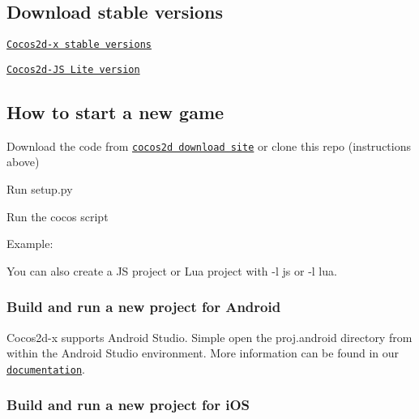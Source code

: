 \subsection*{Download stable versions }


\begin{DoxyItemize}
\item \href{http://www.cocos2d-x.org/download}{\tt Cocos2d-\/x stable versions}
\item \href{http://www.cocos2d-x.org/filecenter/jsbuilder}{\tt Cocos2d-\/\+JS Lite version}
\end{DoxyItemize}

\subsection*{How to start a new game }


\begin{DoxyEnumerate}
\item Download the code from \href{http://www.cocos2d-x.org/download/version#Cocos2d-x}{\tt cocos2d download site} or clone this repo (instructions above)
\item Run {\ttfamily setup.\+py}
\item Run the {\ttfamily cocos} script
\end{DoxyEnumerate}

Example\+: 


You can also create a JS project or Lua project with {\ttfamily -\/l js} or {\ttfamily -\/l lua}.

\subsubsection*{Build and run a new project for Android}

Cocos2d-\/x supports Android Studio. Simple open the {\ttfamily proj.\+android} directory from within the Android Studio environment. More information can be found in our \href{http://www.cocos2d-x.org/docs/cocos2d-x/en/installation/Android-Studio.html}{\tt documentation}.

\subsubsection*{Build and run a new project for i\+OS}

